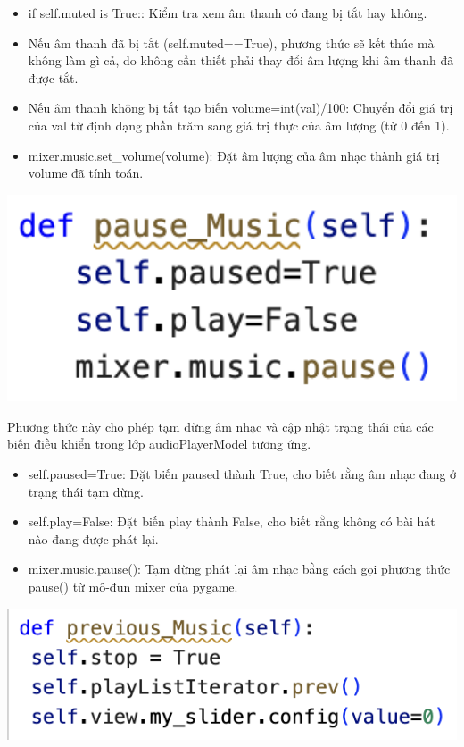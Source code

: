 \documentclass[a4paper]{article}
\begin{document}
\begin{itemize}
    \item if self.muted is True:: Kiểm tra xem âm thanh có đang bị tắt hay không.
    \item Nếu âm thanh đã bị tắt (self.muted==True), phương thức sẽ kết thúc mà không làm gì cả, do không cần thiết phải thay đổi âm lượng khi âm thanh đã được tắt.
    \item Nếu âm thanh không bị tắt tạo biến volume=int(val)/100: Chuyển đổi giá trị của val từ định dạng phần trăm sang giá trị thực của âm lượng (từ 0 đến 1).
    \item mixer.music.set\_volume(volume): Đặt âm lượng của âm nhạc thành giá trị volume đã tính toán.
\end{itemize}

\begin{center}
\includegraphics[width=175mm]{template_SGU 2/audio_pause.png}
\end{center}

\hspace*{0.5} Phương thức này cho phép tạm dừng âm nhạc và cập nhật trạng thái của các biến điều khiển trong lớp audioPlayerModel tương ứng.

\begin{itemize}
    \item self.paused=True: Đặt biến paused thành True, cho biết rằng âm nhạc đang ở trạng thái tạm dừng.
    \item self.play=False: Đặt biến play thành False, cho biết rằng không có bài hát nào đang được phát lại.
    \item mixer.music.pause(): Tạm dừng phát lại âm nhạc bằng cách gọi phương thức pause() từ mô-đun mixer của pygame.
\end{itemize}

\begin{center}
\includegraphics[width=175mm]{template_SGU 2/audio_previous.png}
\end{center}
\end{document}

